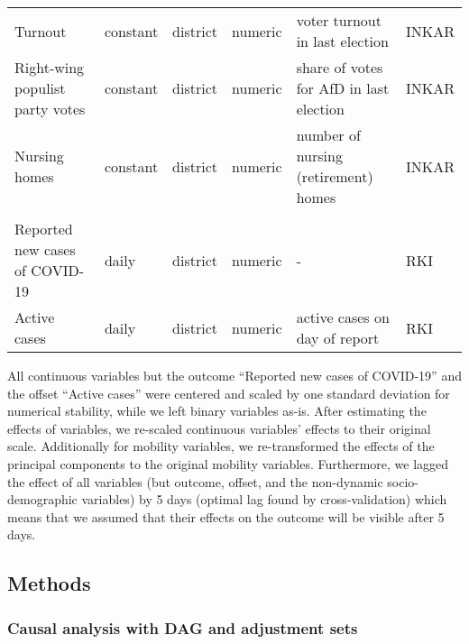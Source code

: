 \documentclass[10pt,letterpaper]{article}
\begin{document}
\begin{table}[!ht]
\begin{adjustwidth}{-2.25in}{0in}
\begin{tabular}[t]{llll>{\raggedright\arraybackslash}p{20em}l}
\hspace{1em}Turnout & constant & district & numeric & voter turnout in last election & INKAR \cite{inkar}\\
\hspace{1em}Right-wing populist party votes & constant & district & numeric & share of votes for AfD in last election & INKAR \cite{inkar}\\
\hspace{1em}Nursing homes & constant & district & numeric & number of nursing (retirement) homes & INKAR \cite{inkar}\\
\addlinespace[0.3em]
\multicolumn{6}{l}{\textbf{Case numbers}}\\
\hspace{1em}Reported new cases of COVID-19 & daily & district & numeric & - & RKI \cite{casenumbers_rki}\\
\hspace{1em}Active cases & daily & district & numeric & active cases on day of report & RKI \cite{casenumbers_rki}\\
\bottomrule
\end{tabular}
\label{tab:model-vars}
\end{adjustwidth}
\end{table}

All continuous variables but the outcome ``Reported new cases of COVID-19'' and the offset ``Active cases'' were centered and scaled by one standard deviation for numerical stability, while we left binary variables as-is. After estimating the effects of variables, we re-scaled continuous variables' effects to their original scale. Additionally for mobility variables, we re-transformed the effects of the principal components to the original mobility variables. Furthermore, we lagged the effect of all variables (but outcome, offset, and the non-dynamic socio-demographic variables) by 5 days (optimal lag found by cross-validation) which means that we assumed that their effects on the outcome will be visible after 5 days.

\subsection*{Methods}\label{methods}

\subsubsection*{Causal analysis with DAG and adjustment
sets}\label{causal-analysis-with-dag-and-adjustment-sets}
\end{document}

